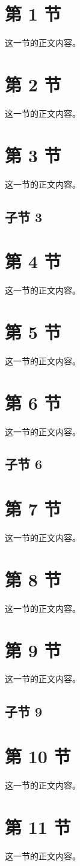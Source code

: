 \documentclass{article}
\begin{document}
\section{第 1 节}
这一节的正文内容。
\section{第 2 节}
这一节的正文内容。
\section{第 3 节}
这一节的正文内容。
\subsection{子节 3}
\section{第 4 节}
这一节的正文内容。
\section{第 5 节}
这一节的正文内容。
\section{第 6 节}
这一节的正文内容。
\subsection{子节 6}
\section{第 7 节}
这一节的正文内容。
\section{第 8 节}
这一节的正文内容。
\section{第 9 节}
这一节的正文内容。
\subsection{子节 9}
\section{第 10 节}
这一节的正文内容。
\section{第 11 节}
这一节的正文内容。
\end{document}

